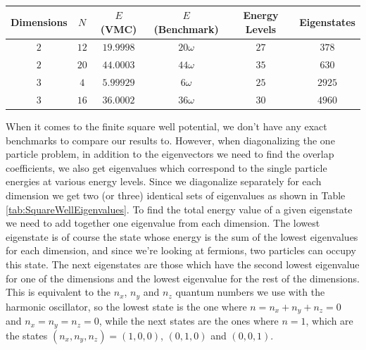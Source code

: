 \documentclass[../main.tex]{subfiles}
\begin{document}
\begin{table}[!ht]
  \centering
  \begin{tabular}{ | c | c | c | c | c | c | }
    \hline
    Dimensions & $N$ & $E$ (VMC) & $E$ (Benchmark) &  Energy Levels & Eigenstates\\*
    \hline
    $2$ & $12$ & $19.9998$ & $20\omega$ & $27$ & $378$ \\*
    \hline
    $2$ & $20$ & $44.0003$ & $44\omega$ & $35$ & $630$ \\*
    \hline
    $3$ & $4$ & $5.99929$ & $6\omega$ & $25$ & $2925$ \\*
    \hline
    $3$ & $16$ & $36.0002$ & $36\omega$ & $30$ & $4960$ \\*
    \hline
  \end{tabular}
  \caption{}
  \label{tab:DoubleHOTestCorrected}
\end{table}

When it comes to the finite square well potential, we don't have any exact benchmarks to compare our results to. However, when diagonalizing the one particle problem, in addition to the eigenvectors we need to find the overlap coefficients, we also get eigenvalues which correspond to the single particle energies at various energy levels. Since we diagonalize separately for each dimension we get two (or three) identical sets of eigenvalues as shown in Table \ref{tab:SquareWellEigenvalues}. To find the total energy value of a given eigenstate we need to add together one eigenvalue from each dimension. The lowest eigenstate is of course the state whose energy is the sum of the lowest eigenvalues for each dimension, and since we're looking at fermions, two particles can occupy this state. The next eigenstates are those which have the second lowest eigenvalue for one of the dimensions and the lowest eigenvalue for the rest of the dimensions. This is equivalent to the $n_x$, $n_y$ and $n_z$ quantum numbers we use with the harmonic oscillator, so the lowest state is the one where $n = n_x + n_y + n_z = 0$ and $n_x=n_y=n_z=0$, while the next states are the ones where $n = 1$, which are the states $(n_x,n_y,n_z) = (1,0,0)$, $(0,1,0)$ and $(0,0,1)$.
\end{document}
